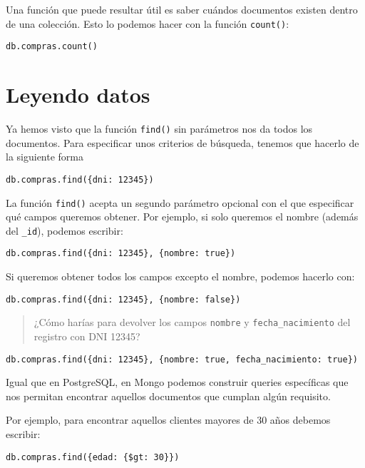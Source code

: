 \documentclass[]{article}
\begin{document}
Una función que puede resultar útil es saber cuándos documentos existen
dentro de una colección. Esto lo podemos hacer con la función
\texttt{count()}:

\begin{verbatim}
db.compras.count()
\end{verbatim}

\hypertarget{leyendo-datos}{%
\section{Leyendo datos}\label{leyendo-datos}}

Ya hemos visto que la función \texttt{find()} sin parámetros nos da
todos los documentos. Para especificar unos criterios de búsqueda,
tenemos que hacerlo de la siguiente forma

\begin{verbatim}
db.compras.find({dni: 12345})
\end{verbatim}

La función \texttt{find()} acepta un segundo parámetro opcional con el
que especificar qué campos queremos obtener. Por ejemplo, si solo
queremos el nombre (además del \texttt{\_id}), podemos escribir:

\begin{verbatim}
db.compras.find({dni: 12345}, {nombre: true})
\end{verbatim}

Si queremos obtener todos los campos excepto el nombre, podemos hacerlo
con:

\begin{verbatim}
db.compras.find({dni: 12345}, {nombre: false})
\end{verbatim}

\begin{quote}
¿Cómo harías para devolver los campos \texttt{nombre} y
\texttt{fecha\_nacimiento} del registro con DNI 12345?
\end{quote}

\begin{verbatim}
db.compras.find({dni: 12345}, {nombre: true, fecha_nacimiento: true})
\end{verbatim}

Igual que en PostgreSQL, en Mongo podemos construir queries específicas
que nos permitan encontrar aquellos documentos que cumplan algún
requisito.

Por ejemplo, para encontrar aquellos clientes mayores de 30 años debemos
escribir:

\begin{verbatim}
db.compras.find({edad: {$gt: 30}})
\end{verbatim}
\end{document}
